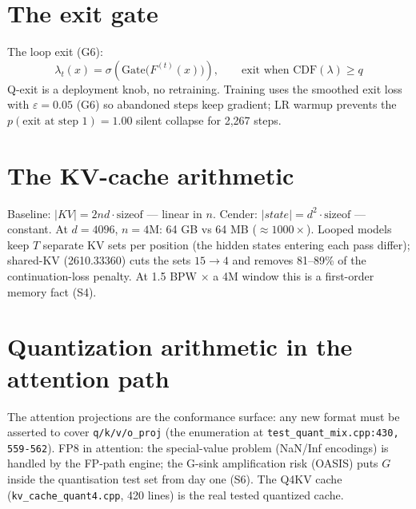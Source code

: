 \section{The exit gate}

The loop exit (G6):
\[ \lambda_t(x) = \sigma\!\left(\mathrm{Gate}\big(F^{(t)}(x)\big)\right), \qquad
   \text{exit when } \mathrm{CDF}(\lambda) \ge q \]
Q-exit is a deployment knob, no retraining. Training uses the smoothed exit loss with
$\varepsilon = 0.05$ (G6) so abandoned steps keep gradient; LR warmup prevents the
$p(\text{exit at step 1}) = 1.00$ silent collapse for 2{,}267 steps.

\section{The KV-cache arithmetic}

Baseline: $|KV| = 2nd\cdot\text{sizeof}$ --- linear in $n$. Cender: $|state| = d^2\cdot\text{sizeof}$
--- constant. At $d{=}4096$, $n{=}4$M: 64 GB vs 64 MB (${\approx}1000\times$). Looped models
keep $T$ separate KV sets per position (the hidden states entering each pass differ); shared-KV
(2610.33360) cuts the sets $15 \to 4$ and removes 81--89\% of the continuation-loss penalty.
At 1.5 BPW $\times$ a 4M window this is a first-order memory fact (S4).

\section{Quantization arithmetic in the attention path}

The attention projections are the conformance surface: any new format must be asserted to
cover \texttt{q/k/v/o\_proj} (the enumeration at \texttt{test\_quant\_mix.cpp:430,
559-562}). FP8 in attention: the special-value problem (NaN/Inf encodings) is handled by the
FP-path engine; the G-sink amplification risk (OASIS) puts $G$ inside the quantisation test
set from day one (S6). The Q4KV cache (\texttt{kv\_cache\_quant4.cpp}, 420 lines) is the real
tested quantized cache.
